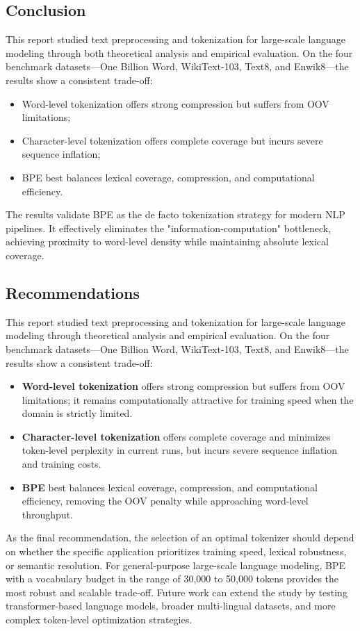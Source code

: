 \subsection{Conclusion}
This report studied text preprocessing and tokenization for large-scale language modeling through both theoretical analysis and empirical evaluation. On the four benchmark datasets---One Billion Word, WikiText-103, Text8, and Enwik8---the results show a consistent trade-off:
\begin{itemize}
    \item Word-level tokenization offers strong compression but suffers from OOV limitations;
    \item Character-level tokenization offers complete coverage but incurs severe sequence inflation;
    \item BPE best balances lexical coverage, compression, and computational efficiency.
\end{itemize}

The results validate BPE as the de facto tokenization strategy for modern NLP pipelines. It effectively eliminates the "information-computation" bottleneck, achieving proximity to word-level density while maintaining absolute lexical coverage.

\subsection{Recommendations}
This report studied text preprocessing and tokenization for large-scale language modeling through theoretical analysis and empirical evaluation. On the four benchmark datasets---One Billion Word, WikiText-103, Text8, and Enwik8---the results show a consistent trade-off:
\begin{itemize}
    \item \textbf{Word-level tokenization} offers strong compression but suffers from OOV limitations; it remains computationally attractive for training speed when the domain is strictly limited.
    \item \textbf{Character-level tokenization} offers complete coverage and minimizes token-level perplexity in current runs, but incurs severe sequence inflation and training costs.
    \item \textbf{BPE} best balances lexical coverage, compression, and computational efficiency, removing the OOV penalty while approaching word-level throughput.
\end{itemize}

As the final recommendation, the selection of an optimal tokenizer should depend on whether the specific application prioritizes training speed, lexical robustness, or semantic resolution. For general-purpose large-scale language modeling, BPE with a vocabulary budget in the range of 30,000 to 50,000 tokens provides the most robust and scalable trade-off. Future work can extend the study by testing transformer-based language models, broader multi-lingual datasets, and more complex token-level optimization strategies.

